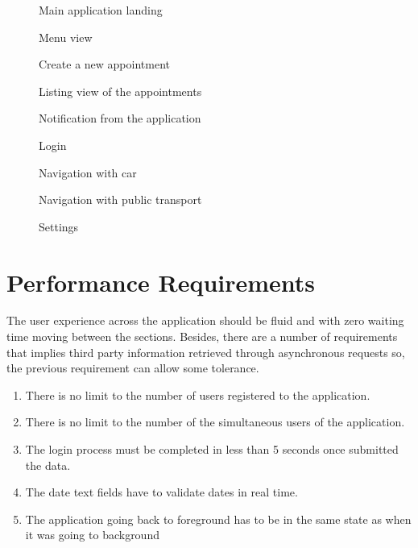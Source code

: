 \begin{figure}[H]
	\caption{Main application landing}
	\centerline{ } 
\end{figure}
\begin{figure}[H]
	\caption{Menu view}
	\centerline{ }
\end{figure}
\begin{figure}[H]
	\caption{Create a new appointment}
	\centerline{ }
\end{figure}
\begin{figure}[H]
	\caption{Listing view of the appointments}
	\centerline{ }
\end{figure}
\begin{figure}[H]
	\caption{Notification from the application}
	\centerline{ }
\end{figure}
\begin{figure}[H]
	\caption{Login}
	\centerline{ }
\end{figure}
\begin{figure}[H]
	\caption{Navigation with car}
	\centerline{ }
\end{figure}
\begin{figure}[H]
	\caption{Navigation with public transport}
	\centerline{ }
\end{figure}
\begin{figure}[H]
	\caption{Settings}
	\centerline{ }
\end{figure}

\section{Performance Requirements}
\label{sec:perf_req}
The user experience across the application should be fluid and with zero waiting time moving between the sections. Besides, there are a number of requirements that implies third party information retrieved through asynchronous requests so, the previous requirement can allow some tolerance.

\begin{enumerate}
\item There is no limit to the number of users registered to the application.
\item There is no limit to the number of the simultaneous users of the application.
\item The login process must be completed in less than 5 seconds once submitted the data.
\item The date text fields have to validate dates in real time.
\item The application going back to foreground has to be in the same state as when it was going to background
\end{enumerate}


